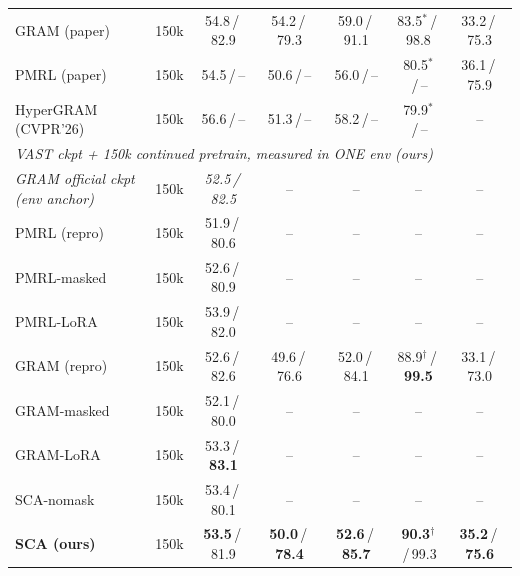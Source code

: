 \begin{table}[t]
\begin{tabular}{llccccc}
GRAM (paper) & 150k & 54.8\,/\,82.9 & 54.2\,/\,79.3 & 59.0\,/\,91.1 & 83.5$^{*}$\,/\,98.8 & 33.2\,/\,75.3 \\
PMRL (paper) & 150k & 54.5\,/\,-- & 50.6\,/\,-- & 56.0\,/\,-- & 80.5$^{*}$\,/\,-- & 36.1\,/\,75.9 \\
HyperGRAM (CVPR'26) & 150k & 56.6\,/\,-- & 51.3\,/\,-- & 58.2\,/\,-- & 79.9$^{*}$\,/\,-- & -- \\
\midrule
\multicolumn{7}{l}{\emph{VAST ckpt + 150k continued pretrain, measured in ONE env (ours)}} \\
\emph{GRAM official ckpt (env anchor)} & 150k & \emph{52.5\,/\,82.5} & -- & -- & -- & -- \\
PMRL (repro) & 150k & 51.9\,/\,80.6 & -- & -- & -- & -- \\
PMRL-masked & 150k & 52.6\,/\,80.9 & -- & -- & -- & -- \\
PMRL-LoRA & 150k & 53.9\,/\,82.0 & -- & -- & -- & -- \\
GRAM (repro) & 150k & 52.6\,/\,82.6 & 49.6\,/\,76.6 & 52.0\,/\,84.1 & 88.9$^{\dagger}$\,/\,\textbf{99.5} & 33.1\,/\,73.0 \\
GRAM-masked & 150k & 52.1\,/\,80.0 & -- & -- & -- & -- \\
GRAM-LoRA & 150k & 53.3\,/\,\textbf{83.1} & -- & -- & -- & -- \\
SCA-nomask & 150k & 53.4\,/\,80.1 & -- & -- & -- & -- \\
\textbf{SCA (ours)} & 150k & \textbf{53.5}\,/\,81.9 & \textbf{50.0}\,/\,\textbf{78.4} & \textbf{52.6}\,/\,\textbf{85.7} & \textbf{90.3}$^{\dagger}$\,/\,99.3 & \textbf{35.2}\,/\,\textbf{75.6} \\
\bottomrule
\end{tabular}
\end{table}

